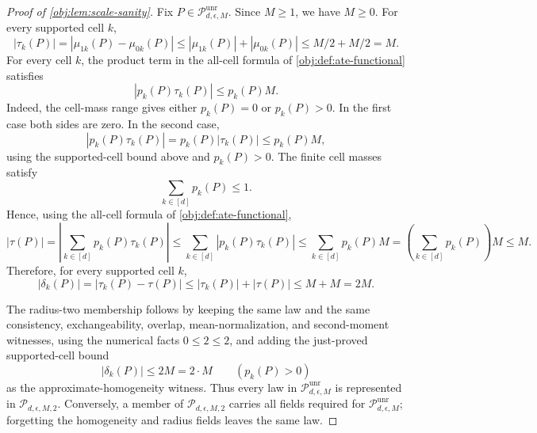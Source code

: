 \begin{proof}[Proof of \cref{obj:lem:scale-sanity}]
Fix \(P\in\mathcal P_{d,\epsilon,M}^{\mathrm{unr}}\).  Since \(M\ge1\), we have \(M\ge0\).  For every supported cell \(k\),
\[
|\tau_k(P)|
=
|\mu_{1k}(P)-\mu_{0k}(P)|
\le |\mu_{1k}(P)|+|\mu_{0k}(P)|
\le M/2+M/2
=M .
\]
For every cell \(k\), the product term in the all-cell formula of \cref{obj:def:ate-functional} satisfies
\[
|p_k(P)\tau_k(P)|\le p_k(P)M .
\]
Indeed, the cell-mass range gives either \(p_k(P)=0\) or \(p_k(P)>0\).  In the first case both sides are zero.  In the second case,
\[
|p_k(P)\tau_k(P)|
=p_k(P)|\tau_k(P)|
\le p_k(P)M,
\]
using the supported-cell bound above and \(p_k(P)>0\). %
The finite cell masses satisfy
\[
\sum_{k\in[d]}p_k(P)\le1 .
\]
Hence, using the all-cell formula of \cref{obj:def:ate-functional},
\[
|\tau(P)|
=
\left|\sum_{k\in[d]}p_k(P)\tau_k(P)\right|
\le
\sum_{k\in[d]}|p_k(P)\tau_k(P)|
\le
\sum_{k\in[d]}p_k(P)M
=
\left(\sum_{k\in[d]}p_k(P)\right)M
\le M .
\]
Therefore, for every supported cell \(k\),
\[
|\delta_k(P)|
=
|\tau_k(P)-\tau(P)|
\le |\tau_k(P)|+|\tau(P)|
\le M+M
=
2M .
\]

The radius-two membership follows by keeping the same law and the same consistency, exchangeability, overlap, mean-normalization, and second-moment witnesses, using the numerical facts \(0\le2\le2\), and adding the just-proved supported-cell bound
\[
|\delta_k(P)|\le 2M=2\cdot M
\qquad (p_k(P)>0)
\]
as the approximate-homogeneity witness. %
Thus every law in \(\mathcal P_{d,\epsilon,M}^{\mathrm{unr}}\) is represented in \(\mathcal P_{d,\epsilon,M,2}\).  Conversely, a member of \(\mathcal P_{d,\epsilon,M,2}\) carries all fields required for \(\mathcal P_{d,\epsilon,M}^{\mathrm{unr}}\); forgetting the homogeneity and radius fields leaves the same law. %
\end{proof}

